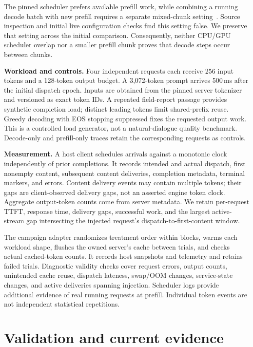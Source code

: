 \documentclass[conference,10pt,letterpaper]{IEEEtran}
\begin{document}
The pinned scheduler prefers available prefill work, while combining a running decode batch with new prefill requires a separate mixed-chunk setting~\cite{sglang}. Source inspection and initial live configuration checks find this setting false. We preserve that setting across the initial comparison. Consequently, neither CPU/GPU scheduler overlap nor a smaller prefill chunk proves that decode steps occur between chunks.

\textbf{Workload and controls.} Four independent requests each receive 256 input tokens and a 128-token output budget. A 3,072-token prompt arrives 500\,ms after the initial dispatch epoch. Inputs are obtained from the pinned server tokenizer and versioned as exact token IDs. A repeated field-report passage provides synthetic completion load; distinct leading tokens limit shared-prefix reuse. Greedy decoding with EOS stopping suppressed fixes the requested output work. This is a controlled load generator, not a natural-dialogue quality benchmark. Decode-only and prefill-only traces retain the corresponding requests as controls.

\textbf{Measurement.} A host client schedules arrivals against a monotonic clock independently of prior completions. It records intended and actual dispatch, first nonempty content, subsequent content deliveries, completion metadata, terminal markers, and errors. Content delivery events may contain multiple tokens; their gaps are client-observed delivery gaps, not an asserted engine token clock. Aggregate output-token counts come from server metadata. We retain per-request TTFT, response time, delivery gaps, successful work, and the largest active-stream gap intersecting the injected request's dispatch-to-first-content window.

The campaign adapter randomizes treatment order within blocks, warms each workload shape, flushes the owned server's cache between trials, and checks actual cached-token counts. It records host snapshots and telemetry and retains failed trials. Diagnostic validity checks cover request errors, output counts, unintended cache reuse, dispatch lateness, swap/OOM changes, service-state changes, and active deliveries spanning injection. Scheduler logs provide additional evidence of real running requests at prefill. Individual token events are not independent statistical repetitions.

\section{Validation and current evidence}

\end{document}
